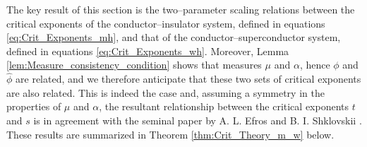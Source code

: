 \documentclass[english,12pt,jmp,graphicx]{revtex4-1}
\newcommand{\ph}{\hat{\phi}}
\begin{document}
The key result of this section is the two--parameter scaling
relations between the critical exponents of the conductor--insulator
system, defined in equations \eqref{eq:Crit_Exponents_mh},
and that of the conductor--superconductor system,
defined in equations \eqref{eq:Crit_Exponents_wh}. Moreover, Lemma
\ref{lem:Measure_consistency_condition} shows that measures $\mu$ and
$\alpha$, hence $\phi$ and $\ph$ are related, and we therefore 
anticipate that these two sets of critical exponents are also
related. This is indeed the case and, assuming a symmetry in the
properties of $\mu$ and $\alpha$, the resultant relationship between the
critical exponents $t$ and $s$ is in agreement with the seminal paper
by A. L. Efros and B. I. Shklovskii \cite{Efros:PSSB-303}. These
results are summarized in Theorem \ref{thm:Crit_Theory_m_w} below.  
%
%
%
\end{document}

